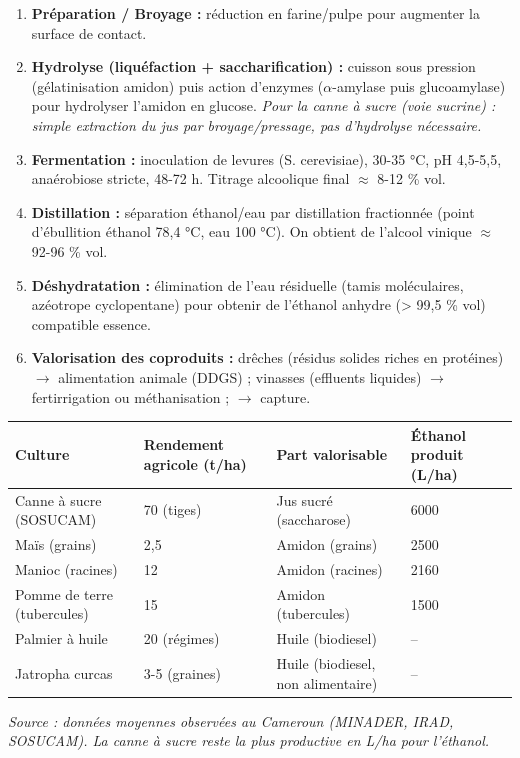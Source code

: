 \documentclass[11pt]{article}
\newcommand{\cle}[1]{{\popxbold\color{popdark}#1}}
\begin{document}
\begin{methode}
\begin{enumerate}
\item \textbf{Préparation / Broyage :} réduction en farine/pulpe pour augmenter la surface de contact.
\item \textbf{Hydrolyse (liquéfaction + saccharification) :} cuisson sous pression (gélatinisation amidon) puis action d'enzymes (\cle{$\alpha$-amylase} puis \cle{glucoamylase}) pour hydrolyser l'amidon en glucose. \emph{Pour la canne à sucre (voie sucrine) : simple extraction du jus par broyage/pressage, pas d'hydrolyse nécessaire.}
\item \textbf{Fermentation :} inoculation de levures (S. cerevisiae), 30-35 °C, pH 4,5-5,5, anaérobiose stricte, 48-72 h. Titrage alcoolique final $\approx$ 8-12 \% vol.
\item \textbf{Distillation :} séparation éthanol/eau par distillation fractionnée (point d'ébullition éthanol 78,4 °C, eau 100 °C). On obtient de l'alcool vinique $\approx$ 92-96 \% vol.
\item \textbf{Déshydratation :} élimination de l'eau résiduelle (tamis moléculaires, azéotrope cyclopentane) pour obtenir de l'éthanol anhydre (> 99,5 \% vol) compatible essence.
\item \textbf{Valorisation des coproduits :} drêches (résidus solides riches en protéines) $\rightarrow$ alimentation animale (DDGS) ; vinasses (effluents liquides) $\rightarrow$ fertirrigation ou méthanisation ;  $\rightarrow$ capture.
\end{enumerate}
\end{methode}

\begin{exemplebox}
\begin{center}
\begin{tabularx}{\linewidth}{|l|X|X|X|}\hline
\rowcolor{popblueL} \textbf{Culture} & \textbf{Rendement agricole (t/ha)} & \textbf{Part valorisable} & \textbf{Éthanol produit (L/ha)} \\ \hline
Canne à sucre (SOSUCAM) & 70 (tiges) & Jus sucré (saccharose) & \num{6000} \\ \hline
Maïs (grains) & 2,5 & Amidon (grains) & \num{2500} \\ \hline
Manioc (racines) & 12 & Amidon (racines) & \num{2160} \\ \hline
Pomme de terre (tubercules) & 15 & Amidon (tubercules) & \num{1500} \\ \hline
Palmier à huile & 20 (régimes) & Huile (biodiesel) & -- \\ \hline
Jatropha curcas & 3-5 (graines) & Huile (biodiesel, non alimentaire) & -- \\ \hline
\end{tabularx}
\end{center}
\emph{Source : données moyennes observées au Cameroun (MINADER, IRAD, SOSUCAM). La canne à sucre reste la plus productive en L/ha pour l'éthanol.}
\end{exemplebox}
\end{document}

